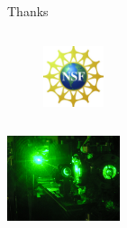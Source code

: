 \documentclass[mathserif]{beamer}
\begin{document}
\begin{frame}{Thanks}
\begin{columns}
\begin{column}{.49\linewidth}
\begin{columns}
      \begin{column}{1in}
        \begin{figure}
          \includegraphics[width=0.7in]{nsf}
        \end{figure}
      \end{column}
    \end{columns}
    \vspace{0.4in}
    \begin{center}
      \includegraphics[width=1.3in]{Laser_Small}
    \end{center}
  \end{column}
\end{columns}
\end{frame}

%
\end{document}
